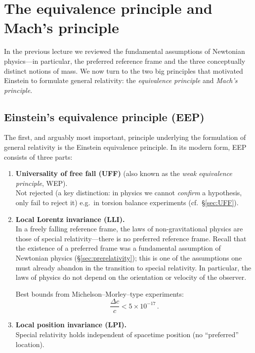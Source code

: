 
\section{The equivalence principle and Mach's principle}%
\label{sec:equivalence-principle}

In the previous lecture we reviewed the fundamental assumptions of
Newtonian physics---in particular, the preferred reference frame and
the three conceptually distinct notions of mass.  We now turn to the
two big principles that motivated Einstein to formulate general
relativity: the \emph{equivalence principle} and \emph{Mach's
principle}.

\subsection{Einstein's equivalence principle (EEP)}

The first, and arguably most important, principle underlying the
formulation of general relativity is the Einstein equivalence
principle.  In its modern form, EEP consists of three parts:

\begin{enumerate}
  \item \textbf{Universality of free fall (UFF)}
    (also known as the \emph{weak equivalence principle}, WEP).\\
    Not rejected (a key distinction: in physics we cannot \emph{confirm}
    a hypothesis, only fail to reject it) e.g.\ in torsion balance
    experiments (cf.~\S\ref{sec:UFF}).

  \item \textbf{Local Lorentz invariance (LLI).}\\
    In a freely falling reference frame, the laws of non-gravitational
    physics are those of special relativity---there is no preferred
    reference frame.  Recall that the existence of a preferred frame
    was a fundamental assumption of Newtonian physics
    (\S\ref{sec:prerelativity}); this is one of the assumptions one
    must already abandon in the transition to special relativity.
    In particular, the laws of physics do not depend on the orientation
    or velocity of the observer.

    \smallskip
    \noindent Best bounds from Michelson--Morley--type experiments:
    \begin{equation}\label{eq:LLI-bound}
      \frac{\Delta c}{c} < 5 \times 10^{-17}\,.
    \end{equation}

  \item \textbf{Local position invariance (LPI).}\\
    Special relativity holds independent of spacetime position
    (no ``preferred'' location).
\end{enumerate}

